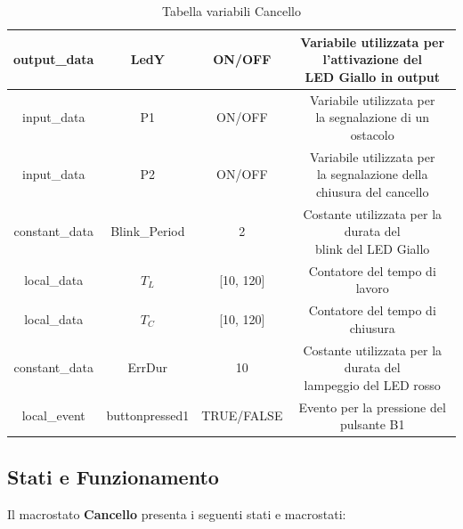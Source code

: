 \begin{table}[H]
\begin{tabular}{ | c | c | c | c |}
                        \hline
                        output\_data & LedY & ON/OFF & \makecell{Variabile utilizzata per l'attivazione del \\ LED Giallo in output} \\
                        
                        \hline
                        input\_data & P1 & ON/OFF & \makecell{Variabile utilizzata per \\ la segnalazione di un ostacolo} \\
                        
                        \hline
                        input\_data & P2 &ON/OFF & \makecell{Variabile utilizzata per \\ la segnalazione della chiusura del cancello} \\
                        
                        \hline
                        constant\_data & Blink\_Period & 2 & \makecell{Costante utilizzata per la durata del \\ blink del LED Giallo} \\
                        
                        \hline
                        local\_data & $T_L$ & [10, 120] & Contatore del tempo di lavoro \\
                        
                        \hline
                        local\_data & $T_C$ & [10, 120] & Contatore del tempo di chiusura \\
                        
                        \hline
                        constant\_data & ErrDur & 10 & \makecell{Costante utilizzata per la durata del \\ lampeggio del LED rosso} \\
                        
                        \hline
                        local\_event & buttonpressed1 & TRUE/FALSE & Evento per la pressione del pulsante B1 \\
                        
                        \hline
                    \end{tabular}
                \caption{Tabella variabili Cancello}
            \end{table}

        \subsection{Stati e Funzionamento}
            Il macrostato \textbf{Cancello} presenta i seguenti stati e macrostati:
                

